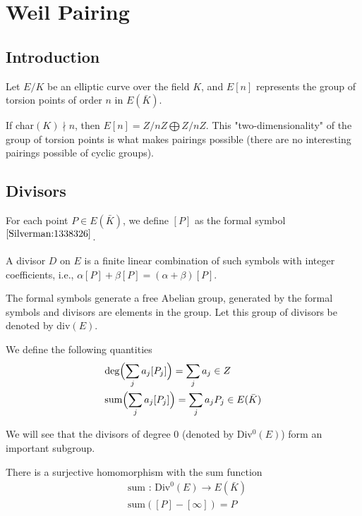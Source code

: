 \chapter{Weil Pairing}\label{chap:weilpairing}

\section{Introduction}

Let $E/K$ be an elliptic curve over the field $K$, and $E[n]$ represents the group of torsion points of order $n$ in $E(\bar{K})$. 

If char$(K) \nmid n$, then $E[n] = Z/nZ \bigoplus Z/nZ$. This "two-dimensionality" of the group of torsion points is what makes pairings possible (there are no interesting pairings possible of cyclic groups). 

\section{Divisors}

For each point $P \in E(\bar{K})$, we define $[P]$ as the formal symbol $^{\cite{Silverman:1338326}}$.

\begin{definition} \label{defn:divisor}
A divisor $D$ on $E$ is a finite linear combination of such symbols with integer coefficients, i.e., $\alpha[P] + \beta[P] = (\alpha + \beta) [P]$. 
\end{definition}

The formal symbols generate a free Abelian group, generated by the formal symbols and divisors are elements in the group. Let this group of divisors be denoted by div$(E)$.

We define the following quantities
\begin{align*}
	&\text{deg} \Bigl( \sum_{j} a_j [P_j] \Bigr) = \sum_{j} a_j \in Z \\
	&\text{sum} \Bigl( \sum_{j} a_j [P_j] \Bigr) = \sum_{j} a_j P_j \in E(\bar{K})
\end{align*}

We will see that the divisors of degree $0$ (denoted by Div$^0 (E)$) form an important subgroup. 

There is a surjective homomorphism with the sum function
\begin{align*}
	&\text{sum : Div}^0 (E) \rightarrow E(\bar{K}) \\
	&\text{sum} ([P] - [\infty]) = P
\end{align*}

